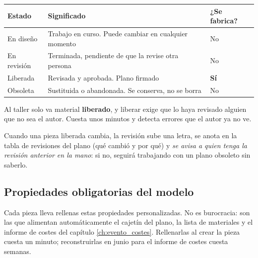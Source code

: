 \begin{center}
\begin{tabularx}{\textwidth}{@{}lXl@{}}
\toprule
\textbf{Estado} & \textbf{Significado} & \textbf{¿Se fabrica?} \\
\midrule
En diseño   & Trabajo en curso. Puede cambiar en cualquier momento & No \\
En revisión & Terminada, pendiente de que la revise otra persona & No \\
Liberada    & Revisada y aprobada. Plano firmado & \textbf{Sí} \\
Obsoleta    & Sustituida o abandonada. Se conserva, no se borra & No \\
\bottomrule
\end{tabularx}
\end{center}

\begin{clave}
Al taller solo va material \textbf{liberado}, y liberar exige que lo haya revisado
alguien que no sea el autor. Cuesta unos minutos y detecta errores que el autor ya
no ve.
\end{clave}

Cuando una pieza liberada cambia, la revisión sube una letra, se anota en la
tabla de revisiones del plano (qué cambió y por qué) y \emph{se avisa a quien
tenga la revisión anterior en la mano}: si no, seguirá trabajando con un plano
obsoleto sin saberlo.

\subsection{Propiedades obligatorias del modelo}

Cada pieza lleva rellenas estas propiedades personalizadas. No es burocracia: son
las que alimentan automáticamente el cajetín del plano, la lista de materiales y
el informe de costes del capítulo \ref{ch:evento_costes}. Rellenarlas al crear la
pieza cuesta un minuto; reconstruirlas en junio para el informe de costes cuesta
semanas.

